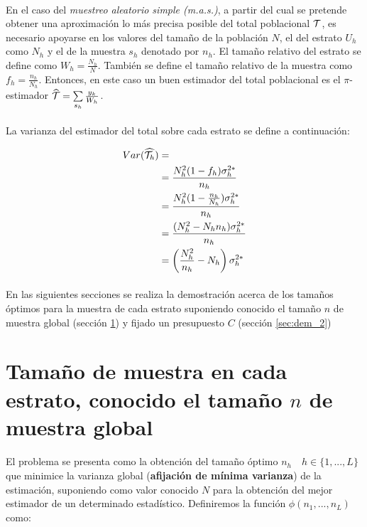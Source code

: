 \documentclass{article}
\begin{document}
    \paragraph{}
    En el caso del \emph{muestreo aleatorio simple (m.a.s.)}, a partir del cual se pretende obtener una aproximación lo más precisa posible del total poblacional $\mathcal{T}$, es necesario apoyarse en los valores del tamaño de la población $N$, el del estrato $U_h$ como $N_h$ y el de la muestra $s_h$ denotado por $n_h$. El tamaño relativo del estrato se define como $W_h = \frac{N_h}{N}$. También se define el tamaño relativo de la muestra como $f_h = \frac{n_h}{N_h}$. Entonces, en este caso un buen estimador del total poblacional es el $\pi$-estimador $\widehat{\mathcal{T}} = \sum\limits_{s_h} \frac{y_k}{W_h}$.

    \paragraph{}
    La varianza del estimador del total sobre cada estrato se define a continuación:

    \begin{align}
      Var(\widehat{\mathcal{T}_h}) &= \\
      &=\frac{N_h^2 (1-f_h)\sigma_h^{2*}}{n_h} \\
      &= \frac{N_h^2 (1-\frac{n_h}{N_h})\sigma_h^{2*}}{n_h} \\
      &= \frac{(N_h^2- N_hn_h)\sigma_h^{2*}}{n_h} \\
      &= \left(\frac{N_h^2}{n_h}- N_h\right)\sigma_h^{2*} \\
    \end{align}

    \paragraph{}
    En las siguientes secciones se realiza la demostración acerca de los tamaños óptimos para la muestra de cada estrato suponiendo conocido el tamaño $n$ de muestra global (sección \ref{sec:dem_1}) y fijado un presupuesto $C$ (sección \ref{sec:dem_2})


    \section{Tamaño de muestra en cada estrato, conocido el tamaño $n$ de muestra global}
    \label{sec:dem_1}

      \paragraph{}
      El problema se presenta como la obtención del tamaño óptimo $n_h \quad h \in \{1,..., L\}$ que minimice la varianza global (\textbf{afijación de mínima varianza}) de la estimación, suponiendo como valor conocido $N$ para la obtención del mejor estimador de un determinado estadístico. Definiremos la función $\phi(n_1, ..., n_L)$ como:
\end{document}
